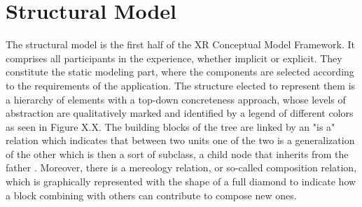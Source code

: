 \section{Structural Model}
\label{sec:conceptual-structural}

The structural model is the first half of the XR Conceptual Model Framework. It comprises all participants in the experience, whether implicit or explicit. They constitute the static modeling part, where the components are selected according to the requirements of the application. The structure elected to represent them is a hierarchy of elements with a top-down concreteness approach, whose levels of abstraction are qualitatively marked and identified by a legend of different colors as seen in Figure X.X. The building blocks of the tree are linked by an "is a" relation which indicates that between two units one of the two is a generalization of the other which is then a sort of subclass, a child node that inherits from the father \cite{brachman_what_1983}. Moreover, there is a mereology relation, or so-called composition relation, which is graphically represented with the shape of a full diamond to indicate how a block combining with others can contribute to compose new ones. 

